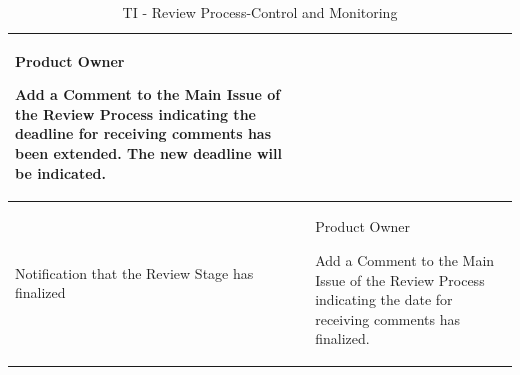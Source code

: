 \documentclass{template/openetcs_article}
\begin{document}
\begin{table}[H]
\begin{tabular}{|m{3cm}|m{11cm}|}
\begin{description}
\item Product Owner\
\item Add a Comment to the Main Issue of the Review Process indicating the deadline for receiving comments has been extended. The new deadline will be indicated.
\end{description}\\\hline
Notification that the Review Stage has finalized &
\begin{description}
\item Product Owner\
\item Add a Comment to the Main Issue of the Review Process indicating the date for receiving comments has finalized.
\end{description} 
\\\hline
\end{tabular}
\caption{TI - Review Process-Control and Monitoring}
\end{table}
\end{document}
